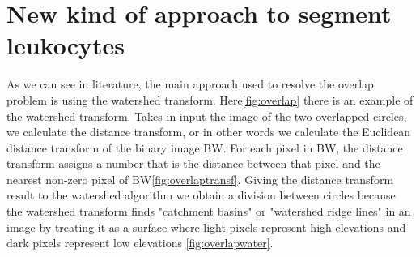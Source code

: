 \section{New kind of approach to segment leukocytes}
As we can see in literature, the main approach used to resolve the overlap problem is using the watershed transform. Here\ref{fig:overlap} there is an example of the watershed transform. Takes in input the image of the two overlapped circles, we calculate the distance transform, or in other words we calculate the Euclidean distance transform of the binary image BW. For each pixel in BW, the distance transform assigns a number that is the distance between that pixel and the nearest non-zero pixel of BW\ref{fig:overlaptransf}. Giving the distance transform result to the watershed algorithm we obtain a division between circles because the watershed transform finds "catchment basins" or "watershed ridge lines" in an image by treating it as a surface where light pixels represent high elevations and dark pixels represent low elevations \ref{fig:overlapwater}.
